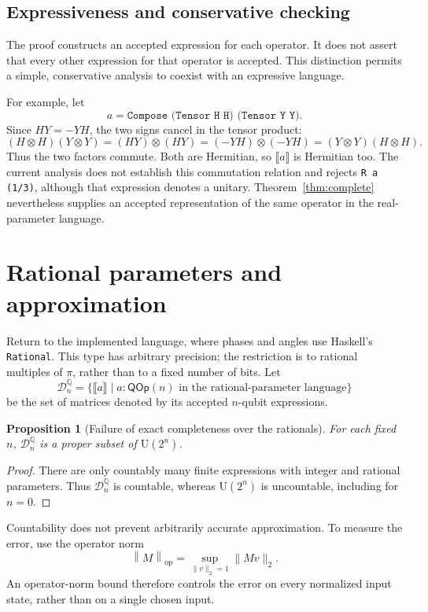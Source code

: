 \documentclass[11pt,a4paper]{article}
\newcommand{\Q}{\mathbb Q}
\newcommand{\U}{\mathrm U}
\newcommand{\sem}[1]{\llbracket #1\rrbracket}
\newcommand{\code}[1]{\texttt{#1}}
\newcommand{\checked}[2]{#1\mathbin{:}\mathsf{QOp}(#2)}
\newcommand{\opnorm}[1]{\left\lVert #1\right\rVert_{\mathrm{op}}}
\newtheorem{proposition}[theorem]{Proposition}
\begin{document}
\subsection{Expressiveness and conservative checking}

The proof constructs an accepted expression for each operator. It does
not assert that every other expression for that operator is accepted.
This distinction permits a simple, conservative analysis to coexist
with an expressive language.

For example, let
\[
  a=\code{Compose (Tensor H H) (Tensor Y Y)}.
\]
Since $HY=-YH$, the two signs cancel in the tensor product:
\[
  (H\otimes H)(Y\otimes Y)
    =(HY)\otimes(HY)
    =(-YH)\otimes(-YH)
    =(Y\otimes Y)(H\otimes H).
\]
Thus the two factors commute. Both are Hermitian, so $\sem a$ is
Hermitian too. The current analysis does not establish this commutation
relation and rejects
\code{R a (1/3)}, although that expression denotes a unitary.
Theorem~\ref{thm:complete} nevertheless supplies an accepted
representation of the same operator in the real-parameter language.

\clearpage
\section{Rational parameters and approximation}

Return to the implemented language, where phases and angles use
Haskell's \code{Rational}. This type has arbitrary precision; the
restriction is to rational multiples of $\pi$, rather than to a
fixed number of bits.
Let
\[
  \mathcal D_n^{\Q}=\{\sem a\mid\checked a n
    \text{ in the rational-parameter language}\}
\]
be the set of matrices denoted by its accepted $n$-qubit expressions.

\begin{proposition}[Failure of exact completeness over the rationals]
For each fixed $n$, $\mathcal D_n^{\Q}$ is a proper subset of $\U(2^n)$.
\end{proposition}
\begin{proof}
There are only countably many finite expressions with integer and
rational parameters. Thus $\mathcal D_n^{\Q}$ is countable, whereas
$\U(2^n)$ is uncountable, including for $n=0$.
\end{proof}

Countability does not prevent arbitrarily accurate approximation.
To measure the error, use the operator norm
\[
  \opnorm M=\sup_{\|v\|_2=1}\|Mv\|_2.
\]
An operator-norm bound therefore controls the error on every normalized
input state, rather than on a single chosen input.
\end{document}
